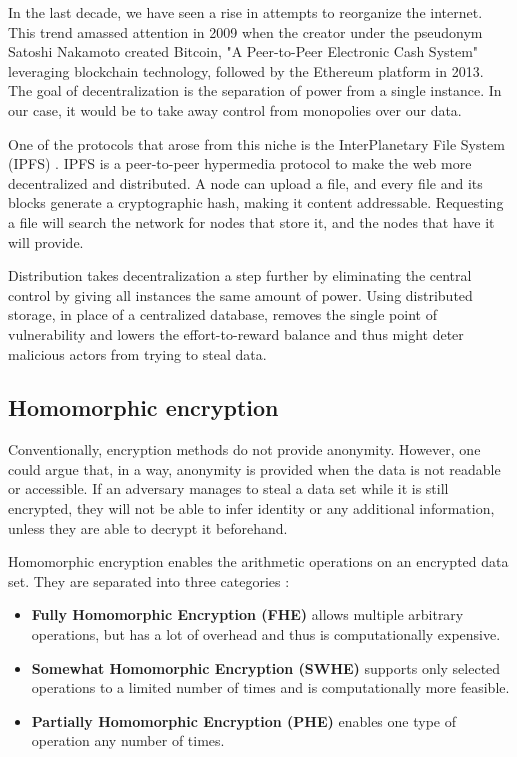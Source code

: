 In the last decade, we have seen a rise in attempts to reorganize the internet. This trend amassed attention in 2009 when the creator under the pseudonym Satoshi Nakamoto  \cite{bitcoin} created Bitcoin, "A Peer-to-Peer Electronic Cash System" leveraging blockchain technology, followed by the Ethereum \cite{ethereum} platform in 2013.
The goal of decentralization is the separation of power from a single instance. In our case, it would be to take away control from monopolies over our data. 

One of the protocols that arose from this niche is the InterPlanetary File System (IPFS) \cite{DBLP:journals/corr/Benet14}. IPFS is a peer-to-peer hypermedia protocol to make the web more decentralized and distributed. A node can upload a file, and every file and its blocks generate a cryptographic hash, making it content addressable. Requesting a file will search the network for nodes that store it, and the nodes that have it will provide.

Distribution takes decentralization a step further by eliminating the central control by giving all instances the same amount of power. Using distributed storage, in place of a centralized database, removes the single point of vulnerability and lowers the effort-to-reward balance and thus might deter malicious actors from trying to steal data.

\subsection{Homomorphic encryption}
Conventionally, encryption methods do not provide anonymity. However, one could argue that, in a way, anonymity is provided when the data is not readable or accessible. If an adversary manages to steal a data set while it is still encrypted, they will not be able to infer identity or any additional information, unless they are able to decrypt it beforehand. 

Homomorphic encryption enables the arithmetic operations on an encrypted data set. They are separated into three categories \cite{DBLP:journals/corr/abs-1812-02428}:
\begin{itemize}
    \item \textbf{Fully Homomorphic Encryption (FHE)} allows multiple arbitrary operations, but has a lot of overhead and thus is computationally expensive.
    \item \textbf{Somewhat Homomorphic Encryption (SWHE)} supports only selected operations to a limited number of times and is computationally more feasible.
    \item \textbf{Partially Homomorphic Encryption (PHE)} enables one type of operation any number of times.
\end{itemize}

